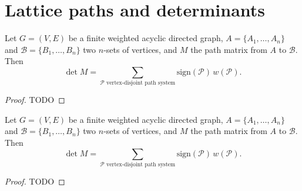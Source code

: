 \chapter{Lattice paths and determinants}

\begin{lemma}
  \label{ch32lemma}
  Let $G = (V, E)$ be a finite weighted acyclic directed graph, $A = \{A_1, \dots, A_n\}$ and $\mathcal{B} = \{B_1, \dots, B_n\}$ two $n$-sets of vertices, and $M$ the path matrix from $A$ to $\mathcal{B}$. Then
  \[
  \det M = \sum_{\mathcal{P} \text{ vertex-disjoint path system}} \text{sign}(\mathcal{P}) \, w(\mathcal{P}). \tag{3}
  \]
\end{lemma}
\begin{proof}
  TODO
\end{proof}

\begin{theorem}
  \label{ch32theorem}
  Let $G = (V, E)$ be a finite weighted acyclic directed graph,
  $A = \{A_1, \dots, A_n\}$ and $\mathcal{B} = \{B_1, \dots, B_n\}$
  two $n$-sets of vertices, and $M$ the path matrix from $A$ to $\mathcal{B}$. Then
  \[
  \det M = \sum_{\mathcal{P} \text{ vertex-disjoint path system}} \text{sign}(\mathcal{P}) \, w(\mathcal{P}). \tag{3}
  \]
\end{theorem}
\begin{proof}
  TODO
\end{proof}
